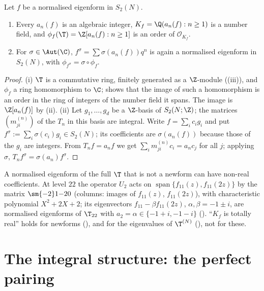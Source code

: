 \begin{proposition}\label{prop:hecke:coefficient-field}
Let $f$ be a normalised eigenform in $S_2(N)$.
\begin{enumerate}[label=(\roman*)]
\item Every $a_n(f)$ is an algebraic integer, $K_f=\Q(a_n(f):n\ge1)$ is a number field, and $\phi_f(\T)=\Z[a_n(f):n\ge1]$ is an order of $\mathcal O_{K_f}$.
\item For $\sigma\in\Aut(\C)$, $f^\sigma=\sum\sigma(a_n(f))q^n$ is again a normalised eigenform in $S_2(N)$, with $\phi_{f^\sigma}=\sigma\circ\phi_f$.
\end{enumerate}
\end{proposition}

\begin{proof}
(i) $\T$ is a commutative ring, finitely generated as a $\Z$-module ((iii)), and $\phi_f$ a ring homomorphism to $\C$;  shows that the
image of such a homomorphism is an order in the ring of integers of the number field it spans. The image is $\Z[a_n(f)]$ by (ii).
(ii) Let $g_1,\dots,g_d$ be a $\Z$-basis of $S_2(N;\Z)$; the matrices $(m^{(n)}_{ji})$ of the $T_n$ in this basis are integral. Write $f=\sum_ic_ig_i$ and put $f^\sigma:=\sum_i\sigma(c_i)g_i\in S_2(N)$;
its coefficients are $\sigma(a_n(f))$ because those of the $g_i$ are integers. From $T_nf=a_nf$ we get $\sum_im^{(n)}_{ji}c_i=a_nc_j$ for all $j$; applying $\sigma$, $T_nf^\sigma=\sigma(a_n)f^\sigma$.
\end{proof}

\begin{warning}\label{warn:hecke:nonreal}
A normalised eigenform of the full $\T$ that is not a newform can have non-real coefficients. At level $22$ the operator $U_2$ acts on $\operatorname{span}\{f_{11}(z),f_{11}(2z)\}$ by the
matrix $\sm{-2}1{-2}0$ (columns: images of $f_{11}(z)$, $f_{11}(2z)$), with characteristic polynomial $X^2+2X+2$; its eigenvectors $f_{11}-\beta f_{11}(2z)$, $\alpha,\beta=-1\pm i$, are
normalised eigenforms of $\T_{22}$ with $a_2=\alpha\in\{-1+i,-1-i\}$ (). ``$K_f$ is totally real'' holds for newforms (),
and for the eigenvalues of $\T^{(N)}$ (), not for these.
\end{warning}

\section{The integral structure: the perfect pairing}\label{sec:hecke:pairing}

